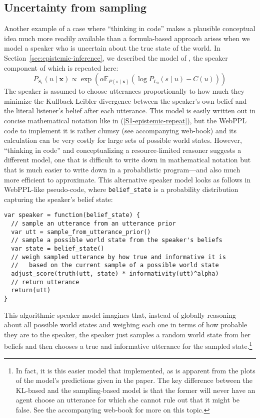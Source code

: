 \documentclass[10pt,letterpaper]{article}
\begin{document}
\subsection*{Uncertainty from sampling}

Another example of a case where ``thinking in code'' makes a plausible conceptual idea much more readily available than a formula-based approach arises when we model a speaker who is uncertain about the true state of the world.
In Section~\ref{sec:epistemic-inference}, we described the model of \cite{goodmanstuhlmuller2013}, the speaker component of which is repeated here:
%
\begin{equation} \label{S1-epistemic-repeat}
P_{S_1}(u\mid \textbf{x}) \propto \exp (\alpha \mathbb{E}_{P(s\mid \textbf{x})}(\log P_{L_0}(s\mid u) - C(u)))
\end{equation}
%
The speaker is assumed to choose utterances proportionally to how much they minimize the Kullback-Leibler divergence between the speaker's own belief and the literal listener's belief after each utterance.
This model is easily written out in concise mathematical notation like in (\ref{S1-epistemic-repeat}), but the WebPPL code to implement it is rather clumsy (see accompanying web-book) and its calculation can be very costly for large sets of possible world states.
However, ``thinking in code'' and conceptualizing a resource-limited reasoner suggests a different model, one that is difficult to write down in mathematical notation but that is much easier to write down in a probabilistic program---and also much more efficient to approximate.
This alternative speaker model looks as follows in WebPPL-like pseudo-code, where \verb|belief_state| is a probability distribution capturing the speaker's belief state:
\begin{lstlisting}
var speaker = function(belief_state) {
  // sample an utterance from an utterance prior
  var utt = sample_from_utterance_prior()
  // sample a possible world state from the speaker's beliefs
  var state = belief_state()
  // weigh sampled utterance by how true and informative it is
  //   based on the current sample of a possible world state
  adjust_score(truth(utt, state) * informativity(utt)^alpha)
  // return utterance
  return(utt)
}
\end{lstlisting}
This algorithmic speaker model imagines that, instead of globally reasoning about all possible world states and weighing each one in terms of how probable they are to the speaker, the speaker just samples a random world state from her beliefs and then chooses a true and informative utterance for the sampled state.\footnote{In fact, it is this easier model that \cite{goodmanstuhlmuller2013} implemented, as is apparent from the plots of the model's predictions given in the paper. The key difference between the KL-based and the sampling-based model is that the former will never have an agent choose an utterance for which she cannot rule out that it might be false. See the accompanying web-book for more on this topic.}
\end{document}
